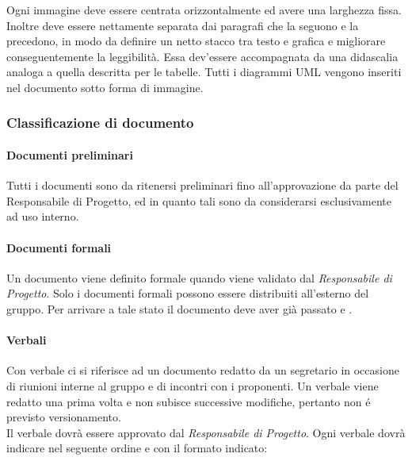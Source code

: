 	Ogni immagine deve essere centrata orizzontalmente ed avere una larghezza fissa. Inoltre deve essere nettamente separata dai paragrafi che la seguono e la precedono, in modo da definire un netto stacco tra testo e grafica e migliorare conseguentemente la leggibilità. Essa dev'essere accompagnata da una didascalia analoga a quella descritta per le tabelle. Tutti i diagrammi UML vengono inseriti nel documento sotto forma di immagine.
	
\subsubsection{Classificazione di documento}

	\paragraph{Documenti preliminari}
	
	Tutti i documenti sono da ritenersi preliminari fino all'approvazione da parte del Responsabile di Progetto, ed in quanto tali sono da considerarsi esclusivamente ad uso interno.
	
	\paragraph{Documenti formali}
	
	Un documento viene definito formale quando viene validato dal \textit{Responsabile di Progetto}. Solo i documenti formali possono essere distribuiti all'esterno del gruppo. Per arrivare a tale stato il documento deve aver già passato  e .
	
	\paragraph{Verbali}
	
	\label{verbale}
	Con verbale ci si riferisce ad un documento redatto da un segretario in occasione  di riunioni interne al gruppo e di incontri con i proponenti. Un verbale viene redatto una prima volta e non subisce successive modifiche, pertanto non é previsto versionamento. \\
	Il verbale dovrà essere approvato dal \textit{Responsabile di Progetto}. Ogni verbale dovrà indicare nel seguente ordine e con il formato indicato:	
	
